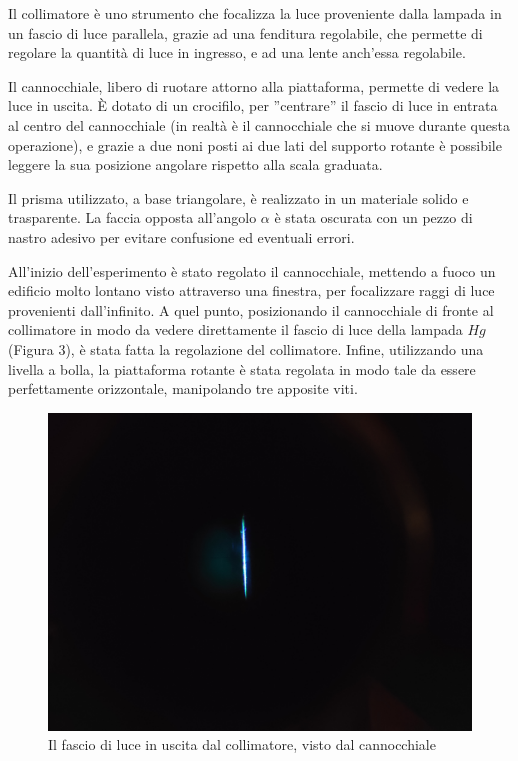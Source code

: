 \documentclass{article}
\begin{document}
\vspace{5mm}

Il collimatore è uno strumento che focalizza la luce proveniente dalla lampada in un fascio di luce parallela, grazie ad una fenditura regolabile, che permette di regolare la quantità di luce in ingresso, e ad una lente anch'essa regolabile. 

\vspace{5mm}

Il cannocchiale, libero di ruotare attorno alla piattaforma, permette di vedere la luce in uscita. È dotato di un crocifilo, per ''centrare'' il fascio di luce in entrata al centro del cannocchiale (in realtà è il cannocchiale che si muove durante questa operazione), e grazie a due noni posti ai due lati del supporto rotante è possibile leggere la sua posizione angolare rispetto alla scala graduata. 

\vspace{5mm}

Il prisma utilizzato, a base triangolare, è realizzato in un materiale solido e trasparente. La faccia opposta all'angolo $\alpha$ è stata oscurata con un pezzo di nastro adesivo per evitare confusione ed eventuali errori.

\vspace{5mm}

All'inizio dell'esperimento è stato regolato il cannocchiale, mettendo a fuoco un edificio molto lontano visto attraverso una finestra, per focalizzare raggi di luce provenienti dall'infinito. A quel punto, posizionando il cannocchiale di fronte al collimatore in modo da vedere direttamente il fascio di luce della lampada $Hg$ (Figura 3), è stata fatta la regolazione del collimatore. Infine, utilizzando una livella a bolla, la piattaforma rotante è stata regolata in modo tale da essere perfettamente orizzontale, manipolando tre apposite viti.

\vspace{5mm}

\begin{figure}[h]
  \centering
  \includegraphics[width=0.5\linewidth]{FotoPrisma2}
  \caption{Il fascio di luce in uscita dal collimatore, visto dal cannocchiale}
\end{figure}
\end{document}
